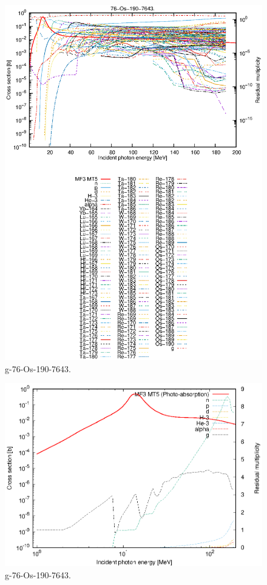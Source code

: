\begin{figure}
 \includegraphics[width=\linewidth]{eps/g_76-Os-190_7643.eps}
  \caption{g-76-Os-190-7643.}
\end{figure}
\newpage \clearpage

\begin{figure}
 \includegraphics[width=\linewidth]{eps-log/g_76-Os-190_7643.eps}
 \caption{g-76-Os-190-7643.}
\end{figure}
\newpage \clearpage


